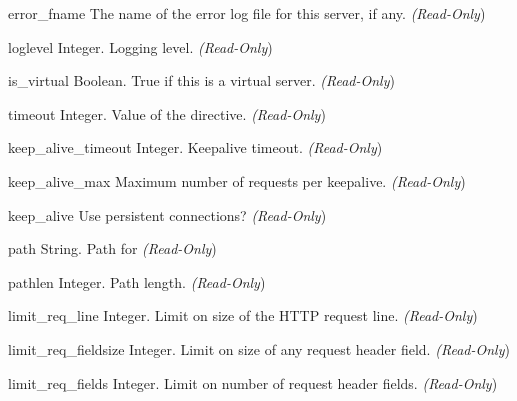 \begin{memberdesc}[server]{error_fname}
The name of the error log file for this server, if any.
\emph{(Read-Only})
\end{memberdesc}

\begin{memberdesc}[server]{loglevel}
Integer. Logging level.
\emph{(Read-Only})
\end{memberdesc}

\begin{memberdesc}[server]{is_virtual}
Boolean. True if this is a virtual server.
\emph{(Read-Only})
\end{memberdesc}

\begin{memberdesc}[server]{timeout}
Integer. Value of the  directive.
\emph{(Read-Only})
\end{memberdesc}

\begin{memberdesc}[server]{keep_alive_timeout}
Integer. Keepalive timeout.
\emph{(Read-Only})
\end{memberdesc}

\begin{memberdesc}[server]{keep_alive_max}
Maximum number of requests per keepalive.
\emph{(Read-Only})
\end{memberdesc}

\begin{memberdesc}[server]{keep_alive}
Use persistent connections?
\emph{(Read-Only})
\end{memberdesc}

\begin{memberdesc}[server]{path}
String. Path for 
\emph{(Read-Only})
\end{memberdesc}

\begin{memberdesc}[server]{pathlen}
Integer. Path length.
\emph{(Read-Only})
\end{memberdesc}

\begin{memberdesc}[server]{limit_req_line}
Integer. Limit on size of the HTTP request line.
\emph{(Read-Only})
\end{memberdesc}

\begin{memberdesc}[server]{limit_req_fieldsize}
Integer. Limit on size of any request header field.
\emph{(Read-Only})
\end{memberdesc}

\begin{memberdesc}[server]{limit_req_fields}
Integer. Limit on number of request header fields.
\emph{(Read-Only})
\end{memberdesc}

